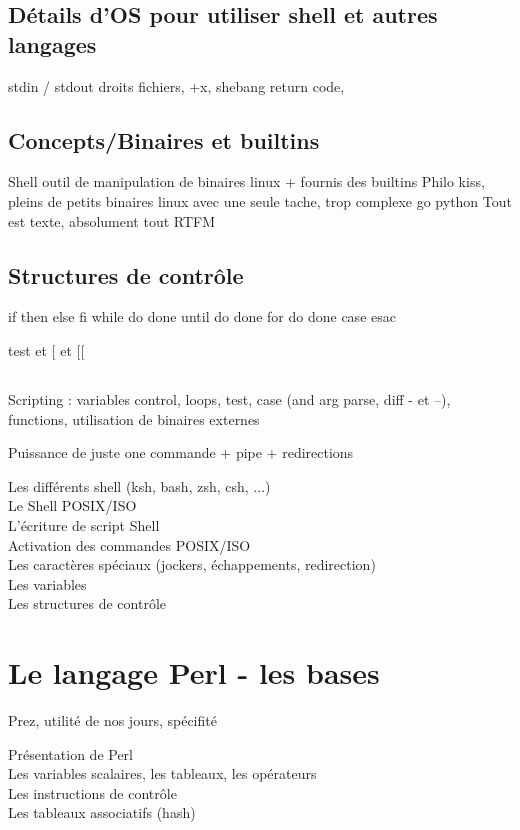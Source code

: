 \documentclass[11pt,a4paper]{article}
\begin{document}
\subsection{Détails d'OS pour utiliser shell et autres langages}
stdin / stdout
droits fichiers, +x, shebang
return code, 

\subsection{Concepts/Binaires et builtins}
Shell outil de manipulation de binaires linux + fournis des builtins
Philo kiss, pleins de petits binaires linux avec une seule tache, trop complexe go python
Tout est texte, absolument tout
RTFM

\subsection{Structures de contrôle}
if then else fi
while do done
until do done
for do done
case esac

test et [ et [[

\subsection{}




Scripting : variables control, loops, test, case (and arg parse, diff - et --), functions, utilisation de binaires externes

Puissance de juste one commande + pipe + redirections

Les différents shell (ksh, bash, zsh, csh, ...)\\
Le Shell POSIX/ISO\\
L'écriture de script Shell \\
Activation des commandes POSIX/ISO\\
Les caractères spéciaux (jockers, échappements, redirection)\\
Les variables\\
Les structures de contrôle\\

\section{Le langage Perl - les bases}
Prez, utilité de nos jours, spécifité

Présentation de Perl\\
Les variables scalaires, les tableaux, les opérateurs\\
Les instructions de contrôle\\
Les tableaux associatifs (hash)\\
\end{document}
